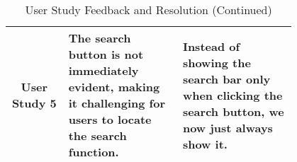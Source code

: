 \begin{table*}

    \centering
    \small %
    \setlength{\extrarowheight}{5pt} %
    \renewcommand{\arraystretch}{1.5} %
    \begin{tabular}{|c|p{0.4\linewidth}|p{0.4\linewidth}|}
        \hline
        User Study 5 & The search button is not immediately evident, making it challenging for users to locate the search function. &
        Instead of showing the search bar only when clicking the search button, we now just always show it. \\
        \hline

    \end{tabular}
    \caption{User Study Feedback and Resolution (Continued)} \label{tab:user_study5}

\end{table*}



